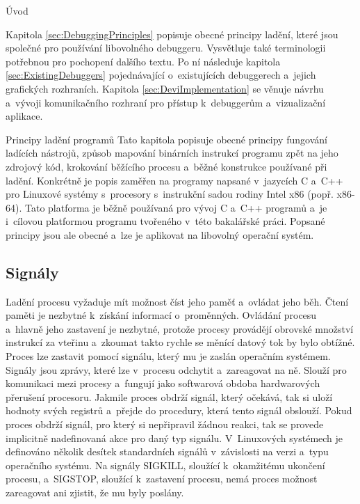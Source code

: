 \documentclass[czech,bachelor,male,python,dept460,hidelinks]{diploma}						%
\newcommand{\parspace}[1][]{
	\ifthenelse{\isempty{#1}}{\vspace{0mm}}{\vspace{#1}}
	\par
}
\begin{document}
\begin{section}{Úvod}
	\parspace Kapitola \ref{sec:DebuggingPrinciples} popisuje obecné principy ladění, které jsou společné pro používání libovolného debuggeru.
	Vysvětluje také terminologii potřebnou pro pochopení dalšího textu. Po ní následuje kapitola \ref{sec:ExistingDebuggers} pojednávající o~existujících
	debuggerech a~jejich grafických rozhraních. Kapitola \ref{sec:DeviImplementation} se věnuje návrhu a~vývoji komunikačního rozhraní pro přístup k~debuggerům
	a~vizualizační aplikace.
\end{section}
\begin{section}{Principy ladění programů}
\label{sec:DebuggingPrinciples}
	Tato kapitola popisuje obecné principy fungování ladících nástrojů, způsob mapování binárních instrukcí programu zpět na jeho zdrojový kód,
	krokování běžícího procesu a~běžné konstrukce používané při ladění. Konkrétně je popis zaměřen na programy napsané v~jazycích C a~C++
	pro Linuxové systémy s~procesory s~instrukční sadou rodiny Intel x86 (popř. x86-64).
	Tato platforma je běžně používaná pro vývoj C a~C++ programů a~je i~cílovou platformou programu tvořeného v~této bakalářské práci.
	Popsané principy jsou ale obecné a~lze je aplikovat na libovolný operační systém.
		
	\subsection{Signály}
		Ladění procesu vyžaduje mít možnost číst jeho paměť a~ovládat jeho běh. Čtení paměti je nezbytné k~získání informací o~proměnných.
		Ovládání procesu a~hlavně jeho zastavení je nezbytné, protože procesy provádějí obrovské množství instrukcí za vteřinu
a~zkoumat takto rychle se měnící datový tok by bylo obtížné. Proces lze zastavit pomocí signálu, který mu je zaslán operačním systémem.
		Signály jsou zprávy, které lze v~procesu odchytit a~zareagovat na ně. \cite[21]{tanenbaum}
		Slouží pro komunikaci mezi procesy a~fungují jako softwarová obdoba hardwarových přerušení procesoru.
		Jakmile proces obdrží signál, který očekává, tak si uloží hodnoty svých registrů a~přejde do procedury, která tento signál obslouží.
		Pokud proces obdrží signál, pro který si nepřipravil žádnou reakci, tak se provede implicitně nadefinovaná akce pro daný typ signálu.
		V~Linuxových systémech je definováno několik desítek standardních signálů v~závislosti na verzi a~typu operačního systému.
		Na signály SIGKILL, sloužící k~okamžitému ukončení procesu, a~SIGSTOP, sloužící k~zastavení procesu, nemá proces možnost zareagovat ani
		zjistit, že mu byly poslány.
	

\end{section}
\end{document}
